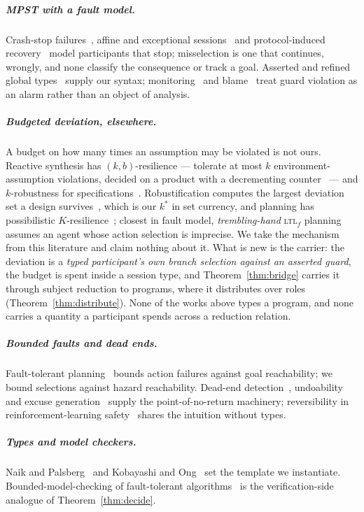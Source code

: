 \documentclass[a4paper,UKenglish,cleveref,autoref,thm-restate,anonymous]{lipics-v2021}
\newcommand{\kstar}{k^{*}}
\begin{document}
\subparagraph*{MPST with a fault model.} Crash-stop
failures~\cite{barwell-concur22,barwell-ecoop23,peters-forte22,viering-oopsla21,lebrun-esop23,hou-ecoop24},
affine and exceptional sessions~\cite{fowler-popl19,lagaillardie-ecoop22} and
protocol-induced recovery~\cite{neykova-cc17} model participants that stop;
misselection is one that continues, wrongly, and none classify the consequence
or track a goal. Asserted and refined global
types~\cite{bocchi-concur10,zhou-oopsla20,gheri-ecoop22,vassor-ecoop24} supply
our syntax; monitoring~\cite{bocchi-forte13} and blame~\cite{jia-popl16} treat
guard violation as an alarm rather than an object of analysis.

\subparagraph*{Budgeted deviation, elsewhere.} A budget on how many times an
assumption may be violated is not ours. Reactive synthesis has
$(k,b)$-resilience --- tolerate at most $k$ environment-assumption violations,
decided on a product with a decrementing counter~\cite{ehlers-hscc14} --- and
$k$-robustness for specifications~\cite{bloem-acta14}. Robustification computes
the largest deviation set a design survives~\cite{zhang-fse20,meiragoes-cav23},
which is our $\kstar$ in set currency, and planning has possibilistic
$K$-resilience~\cite{aineto-ecai23}; closest in fault model,
\emph{trembling-hand} \textsc{ltl}$_f$ planning~\cite{yu-ijcai24} assumes an
agent whose action selection is imprecise. We take the mechanism from this literature and
claim nothing about it. What is new is the carrier: the deviation is a
\emph{typed participant's own branch selection against an asserted guard}, the
budget is spent inside a session type, and Theorem~\ref{thm:bridge} carries it
through subject reduction to programs, where it distributes over roles
(Theorem~\ref{thm:distribute}). None of the works above types a program, and
none carries a quantity a participant spends across a reduction relation.

\subparagraph*{Bounded faults and dead ends.} Fault-tolerant
planning~\cite{domshlak-icaps13,aineto-ecai23} bounds action failures against
goal reachability; we bound selections against hazard reachability. Dead-end
detection~\cite{steinmetz-aaai16,hoffmann-ecai14},
undoability~\cite{daum-icaps16,morak-kr25} and excuse
generation~\cite{gobelbecker-icaps10} supply the point-of-no-return machinery;
reversibility in reinforcement-learning safety~\cite{turner-aies20} shares
the intuition without types.

\subparagraph*{Types and model checkers.} Naik and
Palsberg~\cite{naik-palsberg} and Kobayashi and Ong~\cite{kobayashi-ong} set
the template we instantiate. Bounded-model-checking of
fault-tolerant algorithms~\cite{stoilkovska-tacas19} is the verification-side
analogue of Theorem~\ref{thm:decide}.
\end{document}
